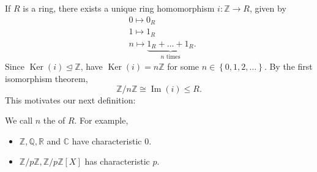 \documentclass[egregdoesnotlikesansseriftitles,a4paper]{scrartcl}
\begin{document}
If $R$ is a ring, there exists a unique ring homomorphism $i: \mathbb{Z} \rightarrow R$, given by 
\begin{align*}
      &0 \mapsto 0_{R}\\
      &1 \mapsto 1_{R}\\
      &n \mapsto \underbrace{1_{R}+\ldots+1_{R}}_{n \text{ times}}.
\end{align*}
Since $\operatorname{Ker}\left(i\right)\unlhd \mathbb{Z}$, have $\operatorname{Ker}\left(i\right)=n\mathbb{Z}$ for some $n \in \left\{0,1,2,\ldots \right\}$. By the first isomorphism theorem, \[
\mathbb{Z}/n\mathbb{Z} \cong \operatorname{Im} \left(i\right) \leq R
.\] This motivates our next definition:
\begin{definition*}[Characteristic]
       We call $n$ the  of $R$. For example,
       \begin{itemize}
             \item $\mathbb{Z},\mathbb{Q},\mathbb{R}$ and $\mathbb{C}$ have characteristic 0. 
             \item $\mathbb{Z}/p\mathbb{Z}, \mathbb{Z}/p\mathbb{Z}[X]$ has characteristic $p$.
       \end{itemize}
\end{definition*}
\end{document}
